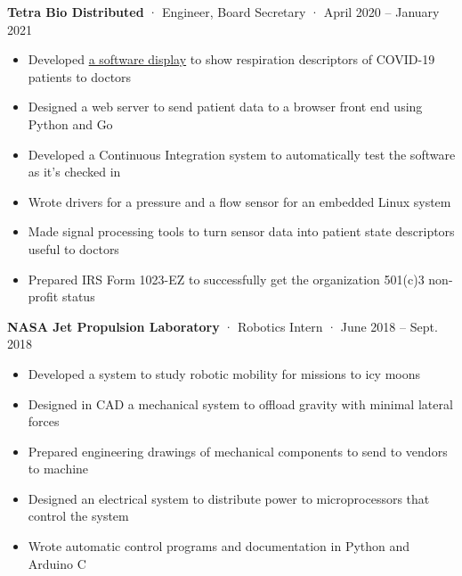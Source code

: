 \documentclass[12pt, oneside]{article}
\newcommand{\jobtitle}[3] {
	{\bf #1} · {#2} · {#3} \vspace{-7pt} \\
}
\begin{document}
\begin{flushleft}
\jobtitle{Tetra Bio Distributed}{Engineer, Board Secretary}{April 2020 – January 2021}
\begin{itemize}
	\item Developed \href{https://github.com/tetrabiodistributed/project-tetra-display}{a software display} to show respiration descriptors of COVID-19 patients to doctors \\
	\item Designed a web server to send patient data to a browser front end using Python and Go \\
	\item Developed a Continuous Integration system to automatically test the software as it's checked in \\
	\item Wrote drivers for a pressure and a flow sensor for an embedded Linux system \\
	\item Made signal processing tools to turn sensor data into patient state descriptors useful to doctors \\
	\item Prepared IRS Form 1023-EZ to successfully get the organization 501(c)3 non-profit status \\
\end{itemize}

\jobtitle{NASA Jet Propulsion Laboratory}{Robotics Intern}{June 2018 – Sept. 2018}
\begin{itemize}
	\item Developed a system to study robotic mobility for missions to icy moons \\
	\item Designed in CAD a mechanical system to offload gravity with minimal lateral forces \\
	\item Prepared engineering drawings of mechanical components to send to vendors to machine \\
	\item Designed an electrical system to distribute power to microprocessors that control the system \\
	\item Wrote automatic control programs and documentation in Python and Arduino C \\
\end{itemize}


\end{flushleft}
\end{document}
